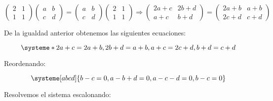 \begin{itemize}[$\bullet$]
    \begin{equation*}
        \begin{pmatrix}
            2 & 1 \\
            1 & 1
        \end{pmatrix}
        \begin{pmatrix}
            a & b \\
            c & d
        \end{pmatrix}
        =
        \begin{pmatrix}
            a & b \\
            c & d
        \end{pmatrix}
        \begin{pmatrix}
            2 & 1 \\
            1 & 1
        \end{pmatrix}
        \Longrightarrow
        \begin{pmatrix}
            2a+c & 2b+d \\
            a+c  & b+d
        \end{pmatrix}
        =
        \begin{pmatrix}
            2a+b & a+b \\
            2c+d & c+d
        \end{pmatrix}
    \end{equation*}

    De la igualdad anterior obtenemos las siguientes ecuaciones:

    \[
        \systeme*{2a + c = 2a + b, 2b + d = a + b, a + c = 2c + d, b + d = c + d}
    \]

    Reordenando:

    \[
        \systeme[abcd]{b - c = 0, a - b + d = 0, a - c - d = 0, b - c = 0}
    \]

    Resolvemos el sistema escalonando:


\end{itemize}
